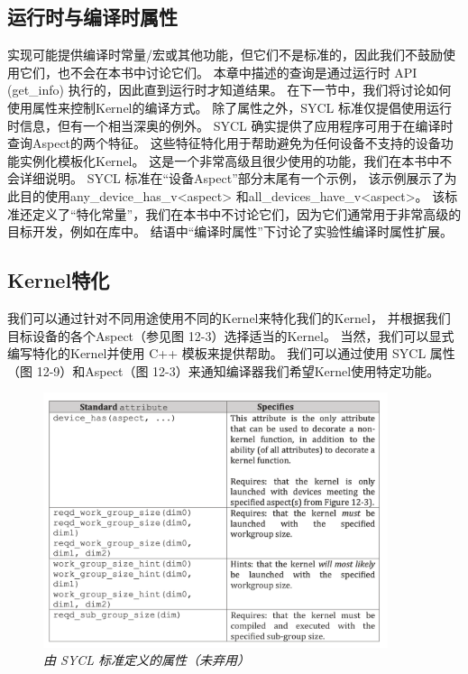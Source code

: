 \subsection{运行时与编译时属性}
实现可能提供编译时常量/宏或其他功能，但它们不是标准的，因此我们不鼓励使用它们，也不会在本书中讨论它们。 
本章中描述的查询是通过运行时 API (get\_info) 执行的，因此直到运行时才知道结果。 
在下一节中，我们将讨论如何使用属性来控制Kernel的编译方式。 
除了属性之外，SYCL 标准仅提倡使用运行时信息，但有一个相当深奥的例外。 
SYCL 确实提供了应用程序可用于在编译时查询Aspect的两个特征。 
这些特征特化用于帮助避免为任何设备不支持的设备功能实例化模板化Kernel。 
这是一个非常高级且很少使用的功能，我们在本书中不会详细说明。 
SYCL 标准在“设备Aspect”部分末尾有一个示例，
该示例展示了为此目的使用any\_device\_has\_v<aspect> 和all\_devices\_have\_v<aspect>。 
该标准还定义了“特化常量”，我们在本书中不讨论它们，因为它们通常用于非常高级的目标开发，例如在库中。 
结语中“编译时属性”下讨论了实验性编译时属性扩展。

\subsection{Kernel特化}
我们可以通过针对不同用途使用不同的Kernel来特化我们的Kernel，
并根据我们目标设备的各个Aspect（参见图 12-3）选择适当的Kernel。 
当然，我们可以显式编写特化的Kernel并使用 C++ 模板来提供帮助。 
我们可以通过使用 SYCL 属性（图 12-9）和Aspect（图 12-3）来通知编译器我们希望Kernel使用特定功能。

\begin{figure}[H]
	\centering
	\includegraphics[width=0.9\textwidth]{figs/F12.9.png}
	\caption{\textit{由 SYCL 标准定义的属性（未弃用） }}
\end{figure}

